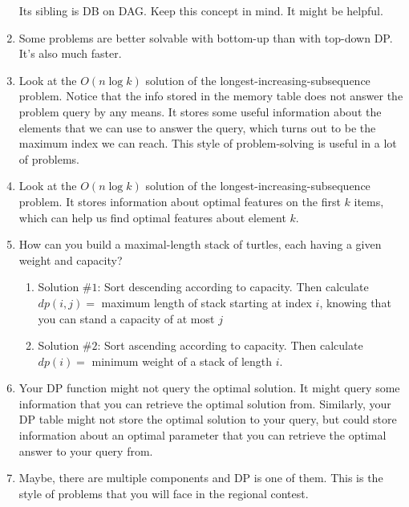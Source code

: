 \documentclass[12pt]{book}
\begin{document}
\begin{enumerate}[label = \roman*.]
Its sibling is DB on DAG. Keep this concept in mind. It might be helpful.
\item Some problems are better solvable with bottom-up than with top-down DP. It's also much faster.

\item Look at the $O(n\log k)$ solution of the longest-increasing-subsequence problem. Notice that the info stored in the memory table does not answer the problem query by any means. It stores some useful information about the elements that we can use to answer the query, which turns out to be the maximum index we can reach. This style of problem-solving is useful in a lot of problems.

\item Look at the $O(n\log k)$ solution of the longest-increasing-subsequence problem. It stores information about optimal features on the first $k$ items, which can help us find optimal features about element $k$.
\item
How can you build a maximal-length stack of turtles, each having a given weight and capacity?
\begin{enumerate}
\item[] Solution $\#1$: Sort descending according to capacity. Then calculate $dp(i, j) = $ maximum length of stack starting at index $i$, knowing that you can stand a capacity of at most $j$
\item[]
Solution $\#2$: Sort ascending according to capacity. Then calculate $dp(i) = $ minimum weight of a stack of length $i$.
\end{enumerate}

\item Your DP function might not query the optimal solution. It might query some information that you can retrieve the optimal solution from. Similarly, your DP table might not store the optimal solution to your query, but could store information about an optimal parameter that you can retrieve the optimal answer to your query from.
\item Maybe, there are multiple components and DP is one of them. This is the style of problems that you will face in the regional contest.
\end{enumerate}
\end{document}
